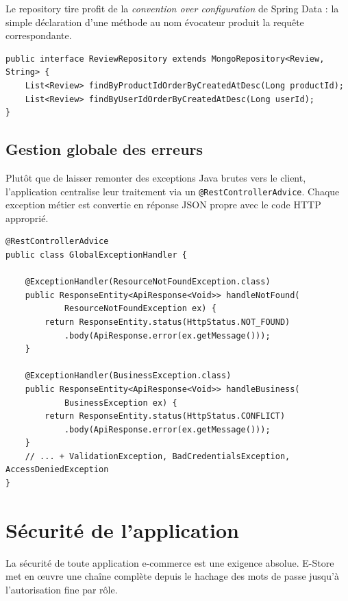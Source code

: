 \documentclass[11pt,a4paper,oneside]{report}
\begin{document}
Le repository tire profit de la \textit{convention over configuration} de
Spring Data : la simple déclaration d'une méthode au nom évocateur produit
la requête correspondante.

\begin{lstlisting}[style=javastyle]
public interface ReviewRepository extends MongoRepository<Review, String> {
    List<Review> findByProductIdOrderByCreatedAtDesc(Long productId);
    List<Review> findByUserIdOrderByCreatedAtDesc(Long userId);
}
\end{lstlisting}

\section{Gestion globale des erreurs}

Plutôt que de laisser remonter des exceptions Java brutes vers le client,
l'application centralise leur traitement via un
\texttt{@RestControllerAdvice}. Chaque exception métier est convertie en
réponse JSON propre avec le code HTTP approprié.

\begin{lstlisting}[style=javastyle, caption=Extrait de GlobalExceptionHandler]
@RestControllerAdvice
public class GlobalExceptionHandler {

    @ExceptionHandler(ResourceNotFoundException.class)
    public ResponseEntity<ApiResponse<Void>> handleNotFound(
            ResourceNotFoundException ex) {
        return ResponseEntity.status(HttpStatus.NOT_FOUND)
            .body(ApiResponse.error(ex.getMessage()));
    }

    @ExceptionHandler(BusinessException.class)
    public ResponseEntity<ApiResponse<Void>> handleBusiness(
            BusinessException ex) {
        return ResponseEntity.status(HttpStatus.CONFLICT)
            .body(ApiResponse.error(ex.getMessage()));
    }
    // ... + ValidationException, BadCredentialsException, AccessDeniedException
}
\end{lstlisting}

\chapter{Sécurité de l'application}

La sécurité de toute application e-commerce est une exigence absolue.
E-Store met en \oe uvre une chaîne complète depuis le hachage des mots de
passe jusqu'à l'autorisation fine par rôle.
\end{document}
